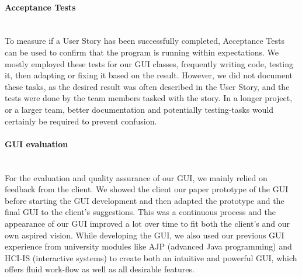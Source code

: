 \paragraph{Acceptance Tests}
\ \\
To measure if a User Story has been successfully completed, Acceptance Tests can be used to confirm that the program is running within expectations. 
We mostly employed these tests for our GUI classes, frequently writing code, testing it, then adapting or fixing it based on the result. 
However, we did not document these tasks, as the desired result was often described in the User Story, and the tests were done by the team members tasked with the story. In a longer project, or a larger team, better documentation and potentially testing-tasks would certainly be required to prevent confusion.

\paragraph{GUI evaluation}
\ \\
For the evaluation and quality assurance of our GUI, we mainly relied on feedback from the client. We showed the client our paper prototype of the GUI before starting the GUI development and then adapted the prototype and the final GUI to the client's suggestions. This was a continuous process and the appearance of our GUI improved a lot over time to fit both the client's and our own aspired vision. While developing the GUI, we also used our previous GUI experience from university modules like AJP (advanced Java programming) and HCI-IS (interactive systems) to create both an intuitive and powerful GUI, which offers fluid work-flow as well as all desirable features.

